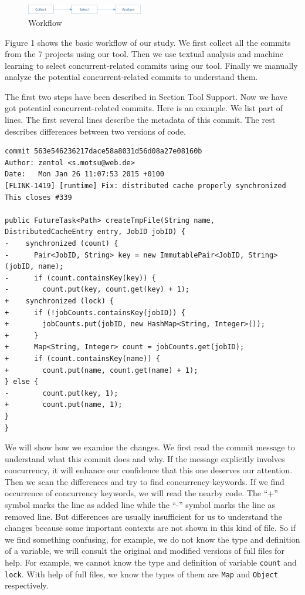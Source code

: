 \begin{figure}
	\centering
	\includegraphics[width=2in]{workflow}
	\caption{Workflow}
\end{figure}

Figure 1 shows the basic workflow of our study. We first collect all the commits from the 7 projects using our tool. Then we use textual analysis and machine learning to select concurrent-related commits using our tool. Finally we manually analyze the potential concurrent-related commits to understand them.

The first two steps have been described in Section Tool Support. Now we have got potential concurrent-related commits. Here is an example. We list part of lines. The first several lines describe the metadata of this commit. The rest describes differences between two versions of code.

\begin{lstlisting}
commit 563e546236217dace58a8031d56d08a27e08160b
Author: zentol <s.motsu@web.de>
Date:   Mon Jan 26 11:07:53 2015 +0100
[FLINK-1419] [runtime] Fix: distributed cache properly synchronized
This closes #339

public FutureTask<Path> createTmpFile(String name, DistributedCacheEntry entry, JobID jobID) {
-    synchronized (count) {
-      Pair<JobID, String> key = new ImmutablePair<JobID, String>(jobID, name);
-      if (count.containsKey(key)) {
-        count.put(key, count.get(key) + 1);
+    synchronized (lock) {
+      if (!jobCounts.containsKey(jobID)) {
+        jobCounts.put(jobID, new HashMap<String, Integer>());
+      }
+      Map<String, Integer> count = jobCounts.get(jobID);
+      if (count.containsKey(name)) {
+        count.put(name, count.get(name) + 1);
} else {
-        count.put(key, 1);
+        count.put(name, 1);
}
}
\end{lstlisting}

We will show how we examine the changes. We first read the commit message to understand what this commit does and why. If the message explicitly involves concurrency, it will enhance our confidence that this one deserves our attention. Then we scan the differences and try to find concurrency keywords. If we find occurrence of concurrency keywords, we will read the nearby code. The ``+'' symbol marks the line as added line while the ``-'' symbol marks the line as removed line. But differences are usually insufficient for us to understand the changes because some important contexts are not shown in this kind of file. So if we find something confusing, for example, we do not know the type and definition of a variable, we will consult the original and modified versions of full files for help. For example, we cannot know the type and definition of variable \texttt{count} and \texttt{lock}. With help of full files, we know the types of them are \texttt{Map} and \texttt{Object} respectively.